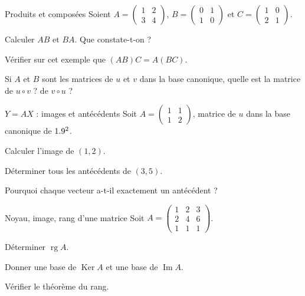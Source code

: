 \begin{exercice}[1]{Produits et composées}
Soient $A=\begin{pmatrix}1&2\\3&4\end{pmatrix}$,
$B=\begin{pmatrix}0&1\\1&0\end{pmatrix}$ et
$C=\begin{pmatrix}1&0\\2&1\end{pmatrix}$.
\begin{questions}
  \item Calculer $AB$ et $BA$. Que constate-t-on ?
  \item Vérifier sur cet exemple que $(AB)C=A(BC)$.
  \item Si $A$ et $B$ sont les matrices de $u$ et $v$ dans la base
    canonique, quelle est la matrice de $u\circ v$ ? de $v\circ u$ ?
\end{questions}
\end{exercice}

\begin{exercice}[1]{$Y=AX$ : images et antécédents}
Soit $A=\begin{pmatrix}1&1\\1&2\end{pmatrix}$, matrice de $u$ dans la base
canonique de $1.9^{2}$.
\begin{questions}
  \item Calculer l'image de $(1,2)$.
  \item Déterminer tous les antécédents de $(3,5)$.
  \item Pourquoi chaque vecteur a-t-il exactement un antécédent ?
\end{questions}
\end{exercice}

\begin{exercice}[1]{Noyau, image, rang d'une matrice}
Soit $A=\begin{pmatrix}1&2&3\\2&4&6\\1&1&1\end{pmatrix}$.
\begin{questions}
  \item Déterminer $\operatorname{rg}A$.
  \item Donner une base de $\operatorname{Ker}A$ et une base de
    $\operatorname{Im}A$.
  \item Vérifier le théorème du rang.
\end{questions}
\end{exercice}

